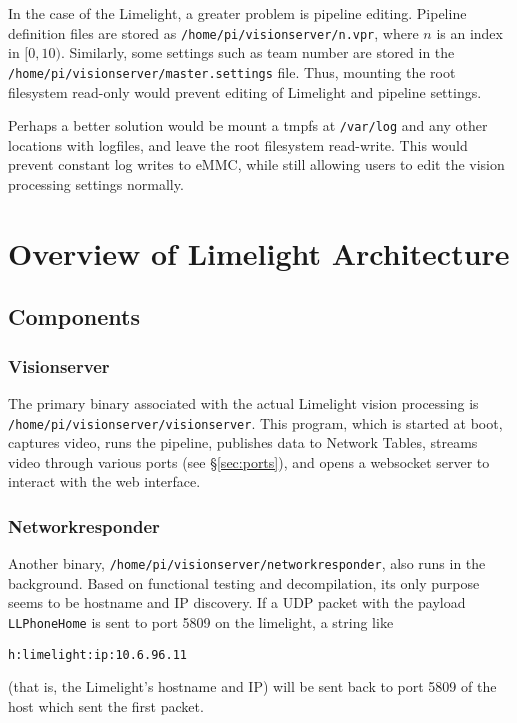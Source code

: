 \documentclass{article}
\begin{document}
\par In the case of the Limelight, a greater problem is pipeline editing. Pipeline definition files are stored as \texttt{/home/pi/visionserver/n.vpr}, where $n$ is an index in $[0,10)$. Similarly, some settings such as team number are stored in the \texttt{/home/pi/visionserver/master.settings} file. Thus, mounting the root filesystem read-only would prevent editing of Limelight and pipeline settings. 
\par Perhaps a better solution would be mount a tmpfs at \texttt{/var/log} and any other locations with logfiles, and leave the root filesystem read-write. This would prevent constant log writes to eMMC, while still allowing users to edit the vision processing settings normally. 

\section{Overview of Limelight Architecture}
\subsection{Components}
\subsubsection{Visionserver}
\par The primary binary associated with the actual Limelight vision processing is \texttt{/home/pi/visionserver/visionserver}. This program, which is started at boot, captures video, runs the pipeline, publishes data to Network Tables, streams video through various ports (see \S \ref{sec:ports}), and opens a websocket server to interact with the web interface. 

\subsubsection{Networkresponder}
\par Another binary, \texttt{/home/pi/visionserver/networkresponder}, also runs in the background. Based on functional testing and decompilation, its only purpose seems to be hostname and IP discovery. If a UDP packet with the payload \texttt{LLPhoneHome} is sent to port 5809 on the limelight, a string like 
\begin{verbatim}
h:limelight:ip:10.6.96.11
\end{verbatim}
(that is, the Limelight's hostname and IP) will be sent back to port 5809 of the host which sent the first packet. 
\end{document}

